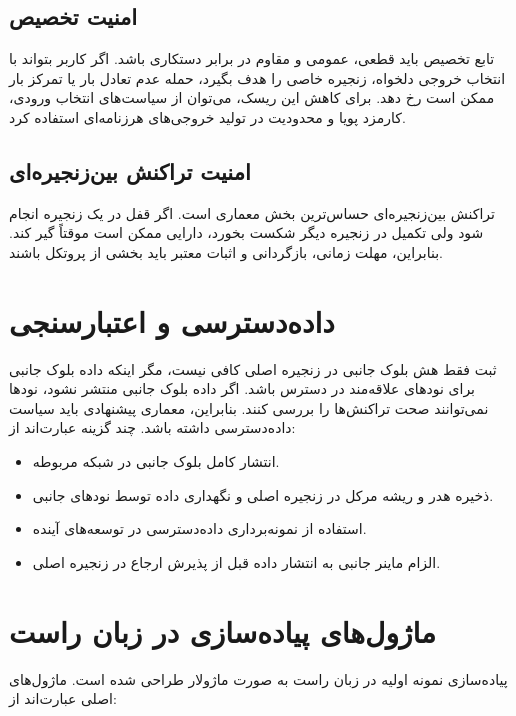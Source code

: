\subsection{امنیت تخصیص}

تابع تخصیص باید قطعی، عمومی و مقاوم در برابر دستکاری باشد. اگر کاربر بتواند با انتخاب خروجی دلخواه، زنجیره خاصی را هدف بگیرد، حمله عدم تعادل بار یا تمرکز بار ممکن است رخ دهد. برای کاهش این ریسک، می‌توان از سیاست‌های انتخاب ورودی، کارمزد پویا و محدودیت در تولید خروجی‌های هرزنامه‌ای استفاده کرد.

\subsection{امنیت تراکنش بین‌زنجیره‌ای}

تراکنش بین‌زنجیره‌ای حساس‌ترین بخش معماری است. اگر قفل در یک زنجیره انجام شود ولی تکمیل در زنجیره دیگر شکست بخورد، دارایی ممکن است موقتاً گیر کند. بنابراین، مهلت زمانی، بازگردانی و اثبات معتبر باید بخشی از پروتکل باشند.

\section{داده‌دسترسی و اعتبارسنجی}

ثبت فقط هش بلوک جانبی در زنجیره اصلی کافی نیست، مگر اینکه داده بلوک جانبی برای نودهای علاقه‌مند در دسترس باشد. اگر داده بلوک جانبی منتشر نشود، نودها نمی‌توانند صحت تراکنش‌ها را بررسی کنند. بنابراین، معماری پیشنهادی باید سیاست داده‌دسترسی داشته باشد. چند گزینه عبارت‌اند از:

\begin{itemize}
\item انتشار کامل بلوک جانبی در شبکه مربوطه.
\item ذخیره هدر و ریشه مرکل در زنجیره اصلی و نگهداری داده توسط نودهای جانبی.
\item استفاده از نمونه‌برداری داده‌دسترسی در توسعه‌های آینده.
\item الزام ماینر جانبی به انتشار داده قبل از پذیرش ارجاع در زنجیره اصلی.
\end{itemize}

\section{ماژول‌های پیاده‌سازی در زبان راست}

پیاده‌سازی نمونه اولیه در زبان راست به صورت ماژولار طراحی شده است. ماژول‌های اصلی عبارت‌اند از:

